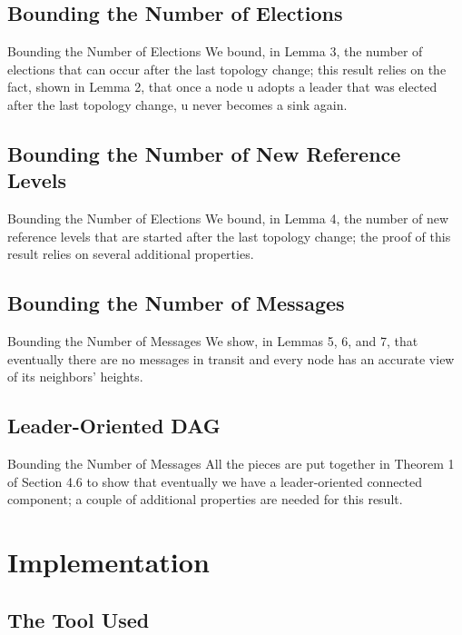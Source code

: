 \documentclass{beamer}
\begin{document}
\subsection{Bounding the Number of Elections}

\begin{frame}{Bounding the Number of Elections}
	We bound, in Lemma 3, the number of elections that can occur after the last topology change; this result relies on the fact, shown in Lemma 2, that once a node u adopts a leader that was elected after the last topology change, u never becomes a sink again.
\end{frame}

\subsection{Bounding the Number of New Reference Levels}
\begin{frame}{Bounding the Number of Elections}
We bound, in Lemma 4, the number of new reference levels that are started after the last topology change; the proof of this result relies on several additional properties.
\end{frame}
\subsection{Bounding the Number of Messages}
\begin{frame}{Bounding the Number of Messages}
We show, in Lemmas 5, 6, and 7, that eventually there are no messages in transit and every node has an accurate view of its neighbors’ heights.
\end{frame}
\subsection{Leader-Oriented DAG}
\begin{frame}{Bounding the Number of Messages}
All the pieces are put together in Theorem 1 of Section 4.6 to show that eventually we have a leader-oriented connected component; a couple of additional properties are needed for this result.
\end{frame}

\section{Implementation}
\subsection{The Tool Used}
\end{document}
